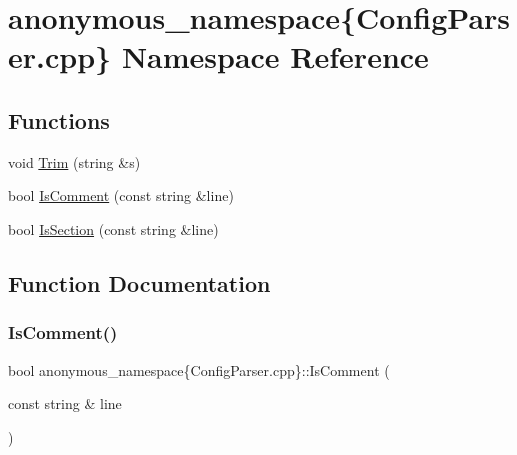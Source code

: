 \hypertarget{namespaceanonymous__namespace_02ConfigParser_8cpp_03}{}\section{anonymous\+\_\+namespace\{Config\+Parser.\+cpp\} Namespace Reference}
\label{namespaceanonymous__namespace_02ConfigParser_8cpp_03}
\subsection*{Functions}
\begin{DoxyCompactItemize}
\item 
void \hyperlink{namespaceanonymous__namespace_02ConfigParser_8cpp_03_a6380a24375bc681b0360fd22af2b6e47}{Trim} (string \&s)
\item 
bool \hyperlink{namespaceanonymous__namespace_02ConfigParser_8cpp_03_af2c09d9a7d2d974236a5010b4997d4c8}{Is\+Comment} (const string \&line)
\item 
bool \hyperlink{namespaceanonymous__namespace_02ConfigParser_8cpp_03_a7eb6b9f06d41272916545b6d69204aeb}{Is\+Section} (const string \&line)
\end{DoxyCompactItemize}


\subsection{Function Documentation}
\mbox{\label{namespaceanonymous__namespace_02ConfigParser_8cpp_03_af2c09d9a7d2d974236a5010b4997d4c8}} 
\subsubsection{\texorpdfstring{Is\+Comment()}{IsComment()}}
{\footnotesize\ttfamily bool anonymous\+\_\+namespace\{Config\+Parser.\+cpp\}\+::Is\+Comment (\begin{DoxyParamCaption}\item[{const string \&}]{line }\end{DoxyParamCaption})}

